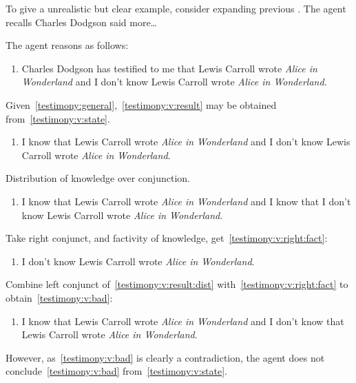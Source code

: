 \begin{note}
  To give a unrealistic but clear example, consider expanding previous .
  The agent recalls Charles Dodgson said more\dots

  \begin{illustration}
    The agent reasons as follows:
    \begin{enumerate}[label=\arabic*\('\)., ref=(\arabic*\('\))]
    \item
      \label{testimony:v:state}
      Charles Dodgson has testified to me that Lewis Carroll wrote \emph{Alice in Wonderland} and I don't know Lewis Carroll wrote \emph{Alice in Wonderland}.
    \end{enumerate}

    Given~\ref{testimony:general},~\ref{testimony:v:result} may be obtained from~\ref{testimony:v:state}.

    \begin{enumerate}[label=\arabic*\('\)., ref=(\arabic*\('\)), resume]
    \item
      \label{testimony:v:result}
      I know that Lewis Carroll wrote \emph{Alice in Wonderland} and I don't know Lewis Carroll wrote \emph{Alice in Wonderland}.
    \end{enumerate}

    Distribution of knowledge over conjunction.

    \begin{enumerate}[label=\arabic*\('\)., ref=(\arabic*\('\)), resume]
    \item
      \label{testimony:v:result:dist}
      I know that Lewis Carroll wrote \emph{Alice in Wonderland} and I know that I don't know Lewis Carroll wrote \emph{Alice in Wonderland}.
    \end{enumerate}

    Take right conjunct, and factivity of knowledge, get~\ref{testimony:v:right:fact}:

    \begin{enumerate}[label=\arabic*\('\)., ref=(\arabic*\('\)), resume]
    \item
      \label{testimony:v:right:fact}
      I don't know Lewis Carroll wrote \emph{Alice in Wonderland}.
    \end{enumerate}

    Combine left conjunct of~\ref{testimony:v:result:dist} with~\ref{testimony:v:right:fact} to obtain~\ref{testimony:v:bad}:

    \begin{enumerate}[label=\arabic*\('\)., ref=(\arabic*\('\)), resume]
    \item
      \label{testimony:v:bad}
      I know that Lewis Carroll wrote \emph{Alice in Wonderland} and I don't know that Lewis Carroll wrote \emph{Alice in Wonderland}.
    \end{enumerate}
    However, as~\ref{testimony:v:bad} is clearly a contradiction, the agent does not conclude~\ref{testimony:v:bad} from~\ref{testimony:v:state}.
  \end{illustration}


\end{note}
